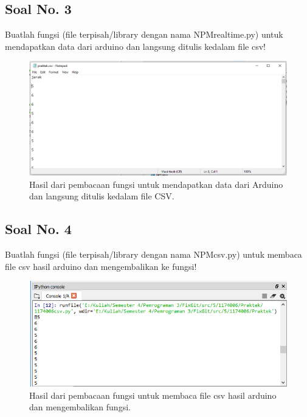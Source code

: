 \subsection{Soal No. 3}
Buatlah  fungsi  (file  terpisah/library  dengan  nama  NPMrealtime.py) untuk mendapatkan data dari arduino dan langsung ditulis kedalam file csv!


\begin{figure}[H]
	\includegraphics[width=12cm]{figures/5/1174031/Praktek/3.png}
	\centering
	\caption{Hasil dari pembacaan fungsi untuk mendapatkan data dari Arduino dan langsung ditulis kedalam file CSV.}
\end{figure}

\subsection{Soal No. 4}
Buatlah fungsi (file terpisah/library dengan nama NPMcsv.py) untuk membaca file csv hasil arduino dan mengembalikan ke fungsi!


\begin{figure}[H]
	\includegraphics[width=12cm]{figures/5/1174031/Praktek/4.png}
	\centering
	\caption{Hasil dari pembacaan fungsi untuk membaca file csv hasil arduino dan mengembalikan fungsi.}
\end{figure}

